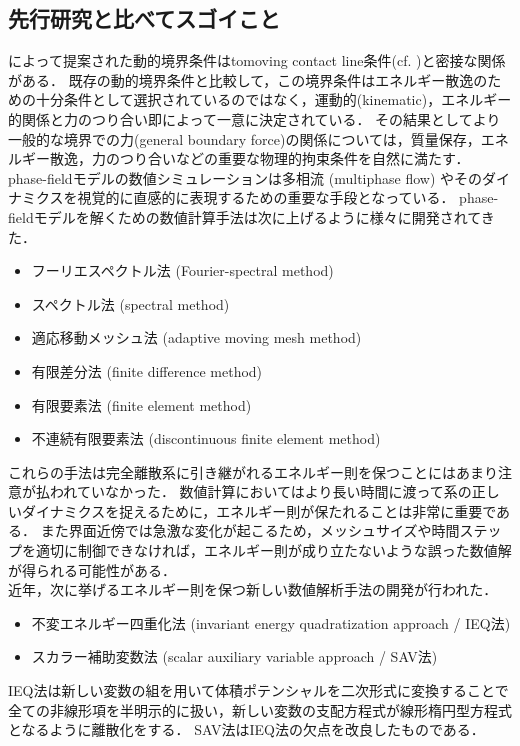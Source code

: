 \documentclass[openary, a4paper, oneside]{jsarticle}
\begin{document}
  \subsection{先行研究と比べてスゴイこと}
  \cite{LiuWu2019}によって提案された動的境界条件はtomoving contact line条件(cf. )と密接な関係がある．
  既存の動的境界条件と比較して，この境界条件はエネルギー散逸のための十分条件として選択されているのではなく，運動的(kinematic)，エネルギー的関係と力のつり合い即によって一意に決定されている．
  その結果としてより一般的な境界での力(general boundary force)の関係については，質量保存，エネルギー散逸，力のつり合いなどの重要な物理的拘束条件を自然に満たす．\\
  phase-fieldモデルの数値シミュレーションは多相流 (multiphase flow) やそのダイナミクスを視覚的に直感的に表現するための重要な手段となっている．
  phase-fieldモデルを解くための数値計算手法は次に上げるように様々に開発されてきた．
  \begin{itemize}
    \item フーリエスペクトル法 (Fourier-spectral method)
    \item スペクトル法 (spectral method)
    \item 適応移動メッシュ法 (adaptive moving mesh method)
    \item 有限差分法 (finite difference method)
    \item 有限要素法 (finite element method)
    \item 不連続有限要素法 (discontinuous finite element method)
  \end{itemize}
  これらの手法は完全離散系に引き継がれるエネルギー則を保つことにはあまり注意が払われていなかった．
  数値計算においてはより長い時間に渡って系の正しいダイナミクスを捉えるために，エネルギー則が保たれることは非常に重要である．
  また界面近傍では急激な変化が起こるため，メッシュサイズや時間ステップを適切に制御できなければ，エネルギー則が成り立たないような誤った数値解が得られる可能性がある．\\
  近年，次に挙げるエネルギー則を保つ新しい数値解析手法の開発が行われた．
  \begin{itemize}
    \item 不変エネルギー四重化法 (invariant energy quadratization approach / IEQ法)
    \item スカラー補助変数法 (scalar auxiliary variable approach / SAV法)
  \end{itemize}
  IEQ法は新しい変数の組を用いて体積ポテンシャルを二次形式に変換することで全ての非線形項を半明示的に扱い，新しい変数の支配方程式が線形楕円型方程式となるように離散化をする．
  SAV法はIEQ法の欠点を改良したものである．
\end{document}
